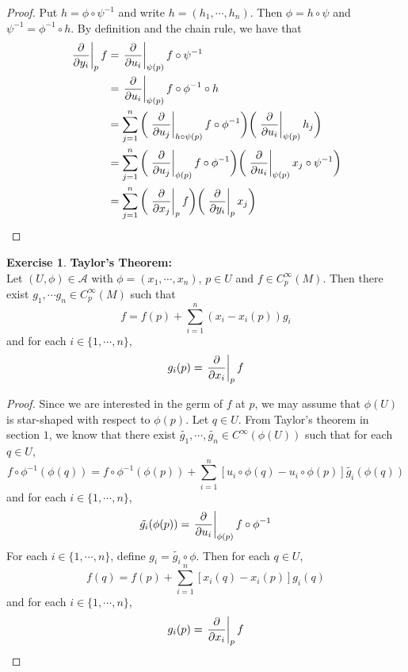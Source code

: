 \documentclass[12pt]{amsart}
\theoremstyle{definition}
\theoremstyle{remark}
\theoremstyle{definition}
\newtheorem{ex}[definition]{Exercise}
\newcommand{\MA}{\mathcal{A}}
\begin{document}
	\begin{proof}
		Put $h = \phi \circ \psi^{-1}$ and write $h = (h_1, \cdots, h_n)$. Then $\phi = h \circ \psi$ and $\psi^{-1} = \phi^{-1} \circ h$. By definition and the chain rule, we have that 
		\begin{align*}
		\eval{\pdv{y_i}}_{p} f 
			&= \eval{\pdv{u_i}}_{\psi(p)} f \circ \psi^{-1} \\
			&= \eval{\pdv{u_i}}_{\psi(p)} f \circ \phi^{-1} \circ h \\
			&= \sum_{j=1}^n \bigg( \eval{\pdv{u_j}}_{h \circ \psi (p)} f \circ \phi^{-1} \bigg)  \bigg( \eval{\pdv{u_i}}_{\psi(p)} h_j \bigg) \\
			&= \sum_{j=1}^n \bigg( \eval{\pdv{u_j}}_{\phi (p)} f \circ \phi^{-1}  \bigg) \bigg( \eval{\pdv{u_i}}_{\psi(p)} x_j \circ \psi^{-1} \bigg) \\
			&= \sum_{j=1}^n \bigg( \eval{\pdv{x_j}}_{p} f \bigg)  \bigg(   \eval{\pdv{y_i}}_{p} x_j  \bigg)\\
		\end{align*}
	\end{proof}

	\begin{ex}\textbf{Taylor's Theorem:}\\
		Let $(U, \phi) \in \MA$ with $\phi = (x_1, \cdots, x_n)$, $p \in U$ and $f \in C^{\infty}_p(M)$. Then there exist $g_1, \cdots g_n \in C_p^{\infty}(M)$ such that $$f = f(p) + \sum_{i=1}^n(x_i - x_i(p)) g_i$$ and for each $i \in \{1, \cdots, n\}$, $$g_i(p) = \eval{\pdv{x_i}}_{p} f $$ 
	\end{ex}

	\begin{proof}
		Since we are interested in the germ of $f$ at $p$, we may assume that $\phi(U)$ is star-shaped with respect to $\phi(p)$. Let $q \in U$. From Taylor's theorem in section $1$, we know that there exist $\tilde{g_1}, \cdots, \tilde{g_n} \in C^{\infty}(\phi(U))$ such that for each $q \in U$, $$f \circ \phi^{-1} (\phi(q)) = f \circ \phi^{-1} (\phi(p)) + \sum_{i = 1}^n [u_i \circ \phi(q) - u_i \circ \phi(p)] \tilde{g_i} (\phi(q))$$ and for each $i \in \{1, \cdots, n\}$, $$\tilde{g_i}(\phi(p)) = \eval{\pdv{u_i}}_{\phi(p)} f \circ \phi^{-1}$$ 
		For each $i \in \{1, \cdots, n\}$, define $g_i = \tilde{g_i} \circ \phi$. Then for each $q \in U$, $$ f (q) = f (p) + \sum_{i = 1}^n [x_i(q) - x_i(p)] g_i(q)$$ and for each $i \in \{1, \cdots, n\}$, $$g_i(p) = \eval{\pdv{x_i}}_{p} f $$ 
	\end{proof}
\end{document}
